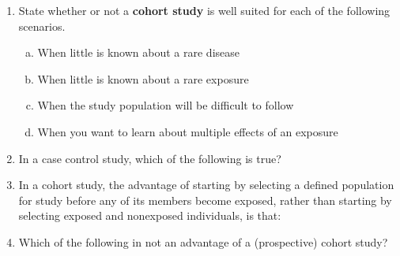 
\begin{enumerate}
\item State whether or not a {\bf cohort study} is well suited for each of the following scenarios.
\begin{enumerate}[(a)]
\item When little is known about a rare disease   
\item When little is known about a rare exposure    
\item When the study population will be difficult to follow   
\item When you want to learn about multiple effects of an exposure    
\end{enumerate}

\item In a case control study, which of the following is true?
\begin{MultipleChoice}
\end{MultipleChoice}

\item In a cohort study, the advantage of starting by selecting a defined population for study before any of its members become exposed, rather than starting by selecting exposed and nonexposed individuals, is that:
\begin{MultipleChoice}
\end{MultipleChoice}

\item Which of the following in not an advantage of a (prospective) cohort study?
\begin{MultipleChoice}
\end{MultipleChoice}
\end{enumerate}

